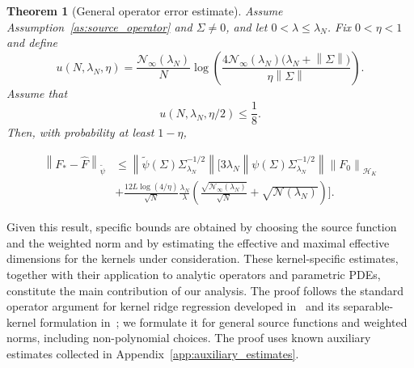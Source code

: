 \documentclass[11pt]{article}
\numberwithin{equation}{section}
\theoremstyle{plain}
\newtheorem{theorem}{Theorem}[section]
\theoremstyle{definition}
\theoremstyle{remark}
\newcommand{\Hs}{\mathcal{H}}
\newcommand{\norm}[1]{\left\lVert#1\right\rVert}
\newcommand{\tpsi}{\widetilde{\psi}}
\begin{document}
\begin{theorem}[General operator error estimate]
\label{thm:general_error}
Assume Assumption~\ref{as:source_operator} and $\Sigma\neq0$, and let
$0<\lambda\leq\lambda_N$. Fix $0<\eta<1$ and define
\begin{equation}
\label{u_def}
u(N,\lambda_N,\eta)
=
\frac{\mathcal{N}_{\infty}(\lambda_N)}{N}
\log\left(
\frac{
4\mathcal{N}_{\infty}(\lambda_N)
\bigl(\lambda_N+\norm{\Sigma}\bigr)
}{
\eta\norm{\Sigma}
}
\right).
\end{equation}
Assume that
\begin{equation}
\label{u_cond}
u(N,\lambda_N,\eta/2)\leq\frac{1}{8}.
\end{equation}
Then, with probability at least $1-\eta$,

\begin{align}
\norm{F_*-\hat{F}}_{\tpsi}
&\leq
\norm{\tpsi(\Sigma)\Sigma_{\lambda_N}^{-1/2}}
\Bigg[
3\lambda_N
\norm{\psi(\Sigma)\Sigma_{\lambda_N}^{-1/2}}
\norm{F_0}_{\Hs_K}
 \nonumber \\ &+
\frac{12L\log(4/\eta)}{\sqrt{N}} \frac{\lambda_N}{\lambda}
\left(
\frac{\sqrt{\mathcal{N}_{\infty}(\lambda_N)}}{\sqrt{N}}  +
\sqrt{\mathcal{N}(\lambda_N)}
\right)
\Bigg].
\label{eq:general_error_bound_operator}
\end{align}
\end{theorem}

Given this result, specific bounds are obtained by choosing the source
function and the weighted norm and by estimating the effective and maximal
effective dimensions for the kernels under consideration. These kernel-specific
estimates, together with their application to analytic operators and
parametric PDEs, constitute the main contribution of our analysis. The proof follows the standard operator argument for kernel ridge regression
developed in~\cite{caponnetto2007optimal} and its separable-kernel formulation
in~\cite{meunier2024optimal}; we formulate it
for general source functions and weighted norms, including non-polynomial
choices. The proof uses known auxiliary estimates collected in
Appendix~\ref{app:auxiliary_estimates}.
\end{document}
